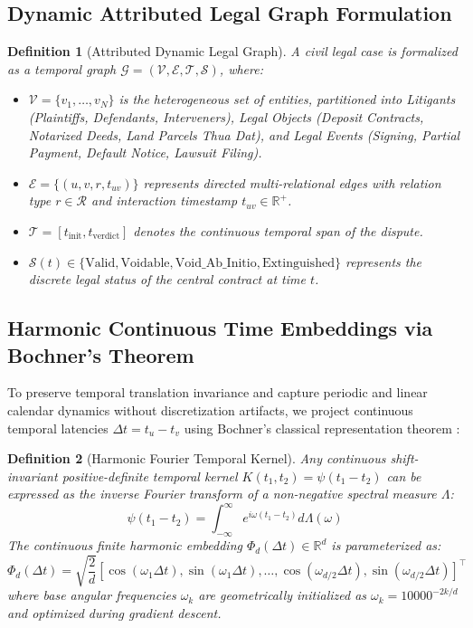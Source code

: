\documentclass[11pt,a4paper]{article}
\newtheorem{definition}{Definition}
\begin{document}
\subsection{Dynamic Attributed Legal Graph Formulation}
\begin{definition}[Attributed Dynamic Legal Graph]
A civil legal case is formalized as a temporal graph $\mathcal{G} = (\mathcal{V}, \mathcal{E}, \mathcal{T}, \mathcal{S})$, where:
\begin{itemize}[leftmargin=*]
    \item $\mathcal{V} = \{v_1, \dots, v_N\}$ is the heterogeneous set of entities, partitioned into Litigants (Plaintiffs, Defendants, Interveners), Legal Objects (Deposit Contracts, Notarized Deeds, Land Parcels \textit{Thua Dat}), and Legal Events (Signing, Partial Payment, Default Notice, Lawsuit Filing).
    \item $\mathcal{E} = \{(u, v, r, t_{uv})\}$ represents directed multi-relational edges with relation type $r \in \mathcal{R}$ and interaction timestamp $t_{uv} \in \mathbb{R}^+$.
    \item $\mathcal{T} = [t_{\text{init}}, t_{\text{verdict}}]$ denotes the continuous temporal span of the dispute.
    \item $\mathcal{S}(t) \in \{\text{Valid}, \text{Voidable}, \text{Void\_Ab\_Initio}, \text{Extinguished}\}$ represents the discrete legal status of the central contract at time $t$.
\end{itemize}
\end{definition}

\subsection{Harmonic Continuous Time Embeddings via Bochner's Theorem}
To preserve temporal translation invariance and capture periodic and linear calendar dynamics without discretization artifacts, we project continuous temporal latencies $\Delta t = t_u - t_v$ using Bochner's classical representation theorem \citep{bochner1959lectures, xu2020inductive, kazemi2019time2vec}:

\begin{definition}[Harmonic Fourier Temporal Kernel]
Any continuous shift-invariant positive-definite temporal kernel $K(t_1, t_2) = \psi(t_1 - t_2)$ can be expressed as the inverse Fourier transform of a non-negative spectral measure $\Lambda$:
\begin{equation}
\psi(t_1 - t_2) = \int_{-\infty}^{\infty} e^{i \omega (t_1 - t_2)} d\Lambda(\omega)
\end{equation}
The continuous finite harmonic embedding $\Phi_d(\Delta t) \in \mathbb{R}^d$ is parameterized as:
\begin{equation}
\Phi_d(\Delta t) = \sqrt{\frac{2}{d}} \left[ \cos(\omega_1 \Delta t), \sin(\omega_1 \Delta t), \dots, \cos(\omega_{d/2} \Delta t), \sin(\omega_{d/2} \Delta t) \right]^\top
\end{equation}
where base angular frequencies $\omega_k$ are geometrically initialized as $\omega_k = 10000^{-2k/d}$ and optimized during gradient descent.
\end{definition}
\end{document}

